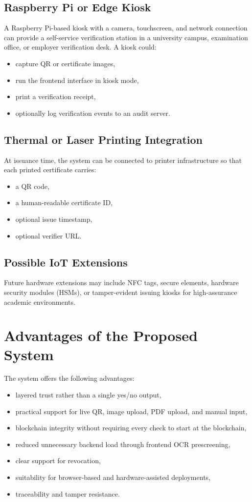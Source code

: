 \documentclass[12pt,a4paper]{article}
\begin{document}
\subsection{Raspberry Pi or Edge Kiosk}
A Raspberry Pi-based kiosk with a camera, touchscreen, and network connection can provide a self-service verification station in a university campus, examination office, or employer verification desk. A kiosk could:
\begin{itemize}[leftmargin=1.5em]
\item capture QR or certificate images,
\item run the frontend interface in kiosk mode,
\item print a verification receipt,
\item optionally log verification events to an audit server.
\end{itemize}

\subsection{Thermal or Laser Printing Integration}
At issuance time, the system can be connected to printer infrastructure so that each printed certificate carries:
\begin{itemize}[leftmargin=1.5em]
\item a QR code,
\item a human-readable certificate ID,
\item optional issue timestamp,
\item optional verifier URL.
\end{itemize}

\subsection{Possible IoT Extensions}
Future hardware extensions may include NFC tags, secure elements, hardware security modules (HSMs), or tamper-evident issuing kiosks for high-assurance academic environments.

\section{Advantages of the Proposed System}
The system offers the following advantages:
\begin{itemize}[leftmargin=1.5em]
\item layered trust rather than a single yes/no output,
\item practical support for live QR, image upload, PDF upload, and manual input,
\item blockchain integrity without requiring every check to start at the blockchain,
\item reduced unnecessary backend load through frontend OCR prescreening,
\item clear support for revocation,
\item suitability for browser-based and hardware-assisted deployments,
\item traceability and tamper resistance.
\end{itemize}
\end{document}
